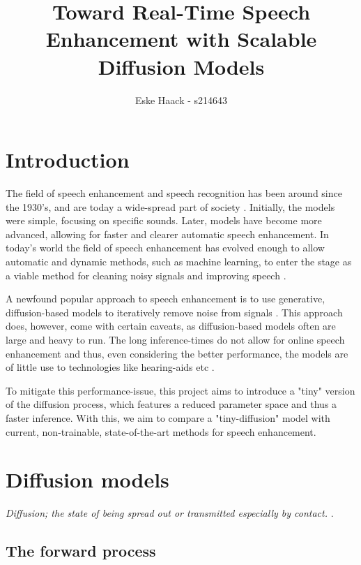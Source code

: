 \documentclass[a4paper, 12pt]{olplainarticle}
\title{Toward Real-Time Speech Enhancement with Scalable Diffusion Models}
\author[1]{Eske Haack - s214643}
\begin{document}
 

\flushbottom
\maketitle 
\thispagestyle{empty} 

\section*{Introduction}

The field of speech enhancement and speech recognition has been around since the 1930's, and are today a wide-spread part of society \citep{speech-history}. 
Initially, the models were simple, focusing on specific sounds. 
Later, models have become more advanced, allowing for faster and clearer automatic speech enhancement. 
In today's world the field of speech enhancement has evolved enough to allow automatic and dynamic methods, 
such as machine learning, to enter the stage as a viable method for cleaning noisy signals and improving speech \citep{tommy-base-paper}.

A newfound popular approach to speech enhancement is to use generative, 
diffusion-based models to iteratively remove noise from signals \citep{tommy-base-paper}. 
This approach does, however, come with certain caveats, as diffusion-based models often are large and heavy to run. 
The long inference-times do not allow for online speech enhancement and thus, even considering the better performance, 
the models are of little use to technologies like hearing-aids etc \citep{tommy-base-paper}.

To mitigate this performance-issue, this project aims to introduce a "tiny" version of the diffusion process, 
which features a reduced parameter space and thus a faster inference. 
With this, we aim to compare a "tiny-diffusion" model with current, non-trainable, 
state-of-the-art methods for speech enhancement.
 
\section*{Diffusion models}

\textit{Diffusion; the state of being spread out or transmitted especially by contact.} \citep{dictionary-diffusion}.

\subsection*{The forward process}
\end{document}
